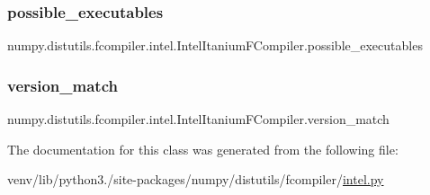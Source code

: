 \subsubsection{\texorpdfstring{possible\+\_\+executables}{possible\_executables}}
{\footnotesize\ttfamily numpy.\+distutils.\+fcompiler.\+intel.\+Intel\+Itanium\+F\+Compiler.\+possible\+\_\+executables\hspace{0.3cm}{\ttfamily [static]}}

\mbox{\label{classnumpy_1_1distutils_1_1fcompiler_1_1intel_1_1IntelItaniumFCompiler_aa47643fed094b13cb20ecba51c7ffe21}} 
\subsubsection{\texorpdfstring{version\+\_\+match}{version\_match}}
{\footnotesize\ttfamily numpy.\+distutils.\+fcompiler.\+intel.\+Intel\+Itanium\+F\+Compiler.\+version\+\_\+match\hspace{0.3cm}{\ttfamily [static]}}



The documentation for this class was generated from the following file\+:\begin{DoxyCompactItemize}
\item 
venv/lib/python3./site-\/packages/numpy/distutils/fcompiler/\hyperlink{intel_8py}{intel.\+py}\end{DoxyCompactItemize}
